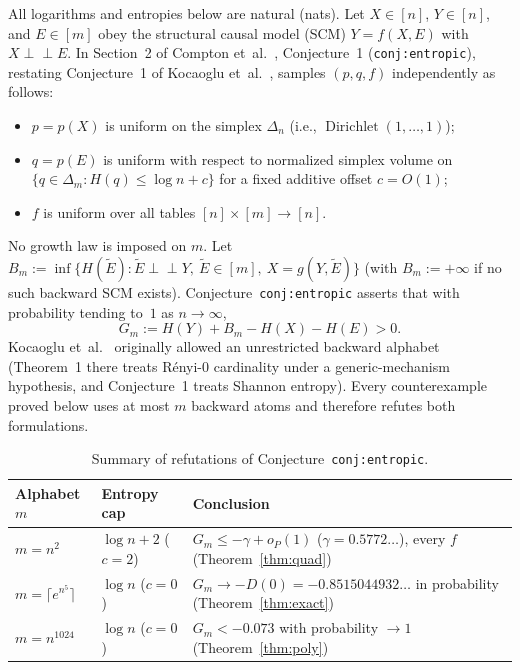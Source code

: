 \documentclass[11pt]{article}
\theoremstyle{plain}
\theoremstyle{definition}
\theoremstyle{remark}
\DeclareMathOperator{\Dir}{Dirichlet}
\newcommand{\indep}{\perp\!\!\!\perp}
\begin{document}
All logarithms and entropies below are natural (nats). Let $X \in [n]$, $Y \in [n]$, and $E \in [m]$ obey the structural causal model (SCM) $Y = f(X, E)$ with $X \indep E$. In Section~2 of Compton et~al.~\cite{Compton2020}, Conjecture~1 (\texttt{conj:entropic}), restating Conjecture~1 of Kocaoglu et~al.~\cite{Kocaoglu2017}, samples $(p, q, f)$ independently as follows:
\begin{itemize}[leftmargin=2em,itemsep=1pt]
\item $p = p(X)$ is uniform on the simplex $\Delta_n$ (i.e., $\Dir(1,\dots,1)$);
\item $q = p(E)$ is uniform with respect to normalized simplex volume on $\{q \in \Delta_m : H(q) \le \log n + c\}$ for a fixed additive offset $c = O(1)$;
\item $f$ is uniform over all tables $[n] \times [m] \to [n]$.
\end{itemize}
No growth law is imposed on $m$. Let $B_m := \inf\{H(\tilde E) : \tilde E \indep Y,\ \tilde E \in [m],\ X = g(Y, \tilde E)\}$ (with $B_m := +\infty$ if no such backward SCM exists). Conjecture~\texttt{conj:entropic} asserts that with probability tending to~$1$ as $n \to \infty$,
\[
G_m := H(Y) + B_m - H(X) - H(E) > 0.
\]
Kocaoglu et~al.~\cite{Kocaoglu2017} originally allowed an unrestricted backward alphabet (Theorem~1 there treats R\'enyi-$0$ cardinality under a generic-mechanism hypothesis, and Conjecture~1 treats Shannon entropy). Every counterexample proved below uses at most $m$ backward atoms and therefore refutes both formulations.

\begin{table}[htbp]
\centering
\small
\begin{tabular}{@{}lll@{}}
\toprule
Alphabet $m$ & Entropy cap & Conclusion \\
\midrule
$m = n^2$ & $\log n + 2$ ($c = 2$) & $G_m \le -\gamma + o_P(1)$ ($\gamma = 0.5772\dots$), every $f$ (Theorem~\ref{thm:quad}) \\
$m = \lceil e^{n^5} \rceil$ & $\log n$ ($c = 0$) & $G_m \to -D(0) = -0.8515044932\dots$ in probability (Theorem~\ref{thm:exact}) \\
$m = n^{1024}$ & $\log n$ ($c = 0$) & $G_m < -0.073$ with probability $\to 1$ (Theorem~\ref{thm:poly}) \\
\bottomrule
\end{tabular}
\caption{Summary of refutations of Conjecture~\texttt{conj:entropic}.}
\label{tab:summary}
\end{table}
\end{document}
